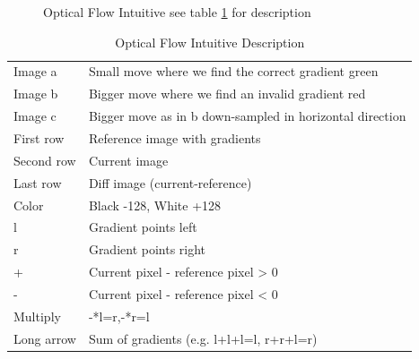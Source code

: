 \documentclass[11pt,a4paper,titlepage,oneside]{report}
\begin{document}
\begin{figure}[H]
  \caption{Optical Flow Intuitive see table \ref{tab:optical_flow_intuitive} for description}
  \label{fig:optical_flow_intuitive}
\end{figure}

\begin{table}[H]
   \centering
   \begin{tabular}{l l}
      Image a & Small move where we find the correct gradient green\\
      Image b & Bigger move where we find an invalid gradient red\\
      Image c & Bigger move as in b down-sampled in horizontal direction\\
      First row & Reference image with gradients\\
      Second row & Current image\\
      Last row & Diff image (current-reference)\\
      Color & Black -128, White +128\\
      l & Gradient points left\\
      r & Gradient points right\\
      + & Current pixel - reference pixel > 0\\
      - & Current pixel - reference pixel < 0\\
      Multiply & -*l=r,-*r=l\\
      Long arrow & Sum of gradients (e.g. l+l+l=l, r+r+l=r)
   \end{tabular}
   \caption{Optical Flow Intuitive Description}
   \label{tab:optical_flow_intuitive}
\end{table}
\end{document}
